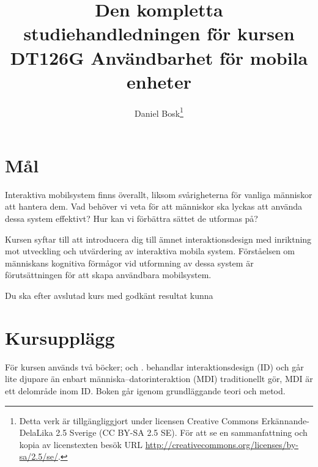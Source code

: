 \documentclass[a4paper,logo]{miunart}
\title{Den kompletta studiehandledningen för kursen\\
  DT126G Användbarhet för mobila enheter}
\author{Daniel Bosk\footnote{%
  Detta verk är tillgängliggjort under licensen Creative Commons 
  Erkännande-DelaLika 2.5 Sverige (CC BY-SA 2.5 SE).
	För att se en sammanfattning och kopia av licenstexten besök URL 
	\url{http://creativecommons.org/licenses/by-sa/2.5/se/}.
}}
\date{\svnId}
\begin{document}
\maketitle
\tableofcontents


\section{Mål}

Interaktiva mobilsystem finns överallt, liksom svårigheterna för vanliga 
människor att hantera dem.
Vad behöver vi veta för att människor ska lyckas att använda dessa system 
effektivt?
Hur kan vi förbättra sättet de utformas på?

Kursen syftar till att introducera dig till ämnet interaktionsdesign med 
inriktning mot utveckling och utvärdering av interaktiva mobila system.
Förståelsen om människans kognitiva förmågor vid utformning av dessa system är 
förutsättningen för att skapa användbara mobilsystem.

Du ska efter avslutad kurs med godkänt resultat kunna
\begin{itemize}
  
\end{itemize}


\section{Kursupplägg}

För kursen används två böcker;  \cite{Sharp2011idb} och 
 \cite{Nielsen2013mu}.
 behandlar interaktionsdesign (ID) och går lite djupare 
än enbart människa--datorinteraktion (MDI) traditionellt gör, MDI är ett 
delområde inom ID.
Boken går igenom grundläggande teori och metod.
\end{document}
